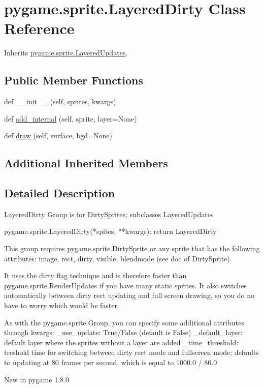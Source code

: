 \hypertarget{classpygame_1_1sprite_1_1_layered_dirty}{}\section{pygame.\+sprite.\+Layered\+Dirty Class Reference}
\label{classpygame_1_1sprite_1_1_layered_dirty}


Inherits \hyperlink{classpygame_1_1sprite_1_1_layered_updates}{pygame.\+sprite.\+Layered\+Updates}.

\subsection*{Public Member Functions}
\begin{DoxyCompactItemize}
\item 
def \hyperlink{classpygame_1_1sprite_1_1_layered_dirty_ab278c1a444f897806ed7fa38f6d19174}{\+\_\+\+\_\+init\+\_\+\+\_\+} (self, \hyperlink{classpygame_1_1sprite_1_1_layered_updates_a882f93b671aae75a92a8512e8cbbb61d}{sprites}, kwargs)
\item 
def \hyperlink{classpygame_1_1sprite_1_1_layered_dirty_a223c7367547ef857ed23cc71cec57e25}{add\+\_\+internal} (self, sprite, layer=None)
\item 
def \hyperlink{classpygame_1_1sprite_1_1_layered_dirty_a8b4d69e07b671c7a0b9db83a94e5a5da}{draw} (self, surface, bgd=None)
\end{DoxyCompactItemize}
\subsection*{Additional Inherited Members}


\subsection{Detailed Description}
\begin{DoxyVerb}LayeredDirty Group is for DirtySprites; subclasses LayeredUpdates

pygame.sprite.LayeredDirty(*spites, **kwargs): return LayeredDirty

This group requires pygame.sprite.DirtySprite or any sprite that
has the following attributes:
    image, rect, dirty, visible, blendmode (see doc of DirtySprite).

It uses the dirty flag technique and is therefore faster than
pygame.sprite.RenderUpdates if you have many static sprites.  It
also switches automatically between dirty rect updating and full
screen drawing, so you do no have to worry which would be faster.

As with the pygame.sprite.Group, you can specify some additional attributes
through kwargs:
    _use_update: True/False   (default is False)
    _default_layer: default layer where the sprites without a layer are
        added
    _time_threshold: treshold time for switching between dirty rect mode
        and fullscreen mode; defaults to updating at 80 frames per second,
        which is equal to 1000.0 / 80.0

New in pygame 1.8.0\end{DoxyVerb}
 

